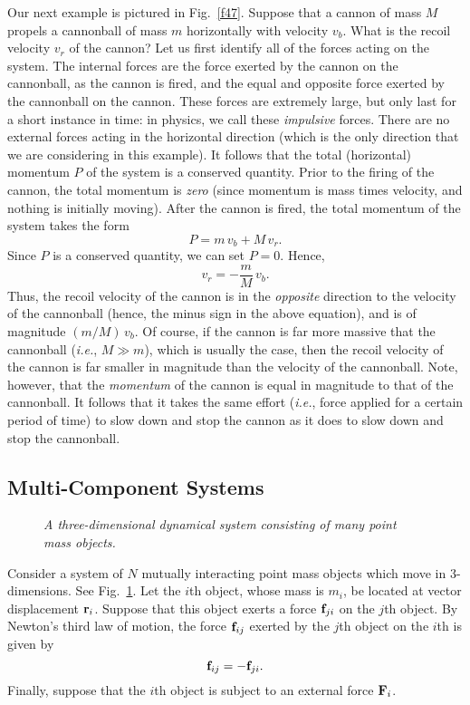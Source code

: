 Our next example is pictured in Fig.~\ref{f47}. Suppose that a cannon of mass $M$ propels a cannonball
of mass $m$
horizontally with velocity $v_b$. What is the recoil velocity $v_r$ of the cannon? Let us
first identify all of the forces acting on the system. The internal forces are
the force exerted by the cannon on the cannonball, as the cannon is fired, and the
equal and opposite force exerted by the cannonball on the cannon. These forces are
extremely large, but only last for a short instance in time: in physics, we call these
 {\em impulsive} forces.
There are no external forces acting
in the horizontal direction (which is the only direction that we are considering in this
example).
 It follows that the total (horizontal) momentum $P$ of the system is a
conserved quantity. Prior to the firing of the cannon, the total momentum is {\em zero} (since
momentum is mass times velocity, and nothing is initially moving). After the cannon is
fired, the total momentum of the system takes the form
\begin{equation}
P = m\,v_b + M\,v_r.
\end{equation}
Since $P$ is a conserved quantity, we can set $P=0$. Hence,
\begin{equation}
v_r = - \frac{m}{M}\,v_b.
\end{equation}
Thus, the recoil velocity of the cannon is in the {\em opposite} direction to
the velocity of the cannonball (hence, the minus sign in the above equation), and
is of magnitude $(m/M)\,v_b$. Of course, if the cannon is far more massive that
the cannonball ({\em i.e.}, $M\gg m$), which is  usually the case, then the recoil velocity of the cannon
is far smaller in magnitude than the velocity of the cannonball. Note, however,
that the {\em momentum} of the cannon is equal in magnitude to that of the cannonball.
It follows that it takes the same effort ({\em i.e.}, force applied for a certain period
of time) to slow down and stop the cannon as it
does to slow down and stop the cannonball.

\subsection{Multi-Component Systems}\label{scm}
\begin{figure}
\epsfysize=3in
\centerline{}
\caption{\em A three-dimensional dynamical system consisting of many point mass objects.}\label{f49}  
\end{figure}

Consider a system of $N$ mutually interacting point mass objects which move in 3-dimensions.
See Fig.~\ref{f49}.
Let the $i$th object, whose mass is $m_i$, be located at vector displacement ${\bf r}_i$.
Suppose that this object exerts a force ${\bf f}_{ji}$ on the $j$th object. By Newton's third
law of motion, the force ${\bf f}_{ij}$ exerted  by the $j$th object on the $i$th  is
given by
\begin{equation}
{\bf f}_{ij} = - {\bf f}_{ji}.
\end{equation}
Finally, suppose that the $i$th object is subject to an external force ${\bf F}_i$. 


